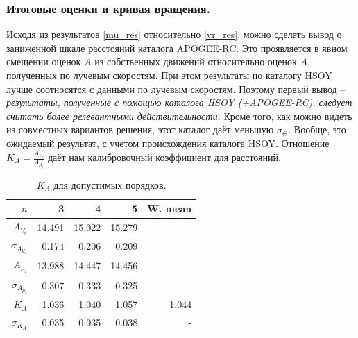 \documentclass{matmex-diploma-custom}
\begin{document}
\subsubsection{Итоговые оценки и кривая вращения.}
Исходя из результатов \ref{mu_res} относительно \ref{vr_res}, можно сделать вывод о заниженной шкале расстояний каталога APOGEE-RC. Это проявляется в явном смещении оценок $A$ из собственных движений относительно оценок $A$, полученных по лучевым скоростям. При этом результаты по каталогу HSOY лучше соотносятся с данными по лучевым скоростям. Поэтому первый вывод -- \textit{результаты, полученные с помощью каталога HSOY (+APOGEE-RC), следует считать более релевантными действительности.} Кроме того, как можно видеть из совместных вариантов решения, этот каталог даёт меньшую $\sigma_{\Theta}$. Вообще, это ожидаемый результат, с учетом происхождения каталога HSOY. Отношение $K_A = \frac{A_{V_r}}{A_{\mu_l}}$ даёт нам калибровочный коэффициент для расстояний. 

\begin{table}[h!!] 
\centering
\caption{$K_A$ для допустимых порядков.}
\begin{tabular}{r|rrr|r}
        $ n$ & 3 & 4 & 5 & W. mean\\
\hline
\hline
$A_{V_r} $& 14.491     &    15.022 &  15.279  &\\
$\sigma_{A_{V_r}}$& 0.174     &  0.206 &   0.209  &\\
$A_{\mu_l} $& 13.988     &  14.447 & 14.456  &\\
$\sigma_{A_{\mu_l}}$& 0.307     & 0.333 & 0.325  &\\
\hline
$K_A$& 1.036     &   1.040 &  1.057  & 1.044\\
$ \sigma_{K_A}$& 0.035     & 0.035 &  0.038  & -\\
\end{tabular}
\end{table}
\end{document}
